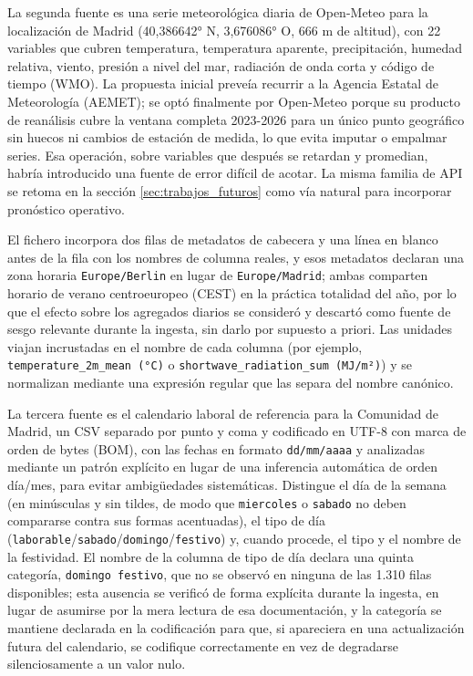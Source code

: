 La segunda fuente es una serie meteorológica diaria de Open-Meteo para la localización de
Madrid (40,386642° N, 3,676086° O, 666 m de altitud), con 22 variables que cubren
temperatura, temperatura aparente, precipitación, humedad relativa, viento, presión a
nivel del mar, radiación de onda corta y código de tiempo (WMO). La propuesta inicial
preveía recurrir a la Agencia Estatal de Meteorología (AEMET); se optó finalmente por
Open-Meteo porque su producto de reanálisis cubre la ventana completa 2023-2026 para un
único punto geográfico sin huecos ni cambios de estación de medida, lo que evita imputar o
empalmar series. Esa operación, sobre variables que después se retardan y promedian,
habría introducido una fuente de error difícil de acotar. La misma familia de API se
retoma en la sección \ref{sec:trabajos_futuros} como vía natural para incorporar
pronóstico operativo.

El fichero incorpora dos filas de metadatos de cabecera y una línea en blanco antes de la
fila con los nombres de columna reales, y esos metadatos declaran una zona horaria
\texttt{Europe/\allowbreak{}Berlin} en lugar de \texttt{Europe/\allowbreak{}Madrid}; ambas comparten horario de
verano centroeuropeo (CEST) en la práctica totalidad del año, por lo que el efecto sobre
los agregados diarios se consideró y descartó como fuente de sesgo relevante durante la
ingesta, sin darlo por supuesto a priori. Las unidades viajan incrustadas en el nombre de
cada columna (por ejemplo, \texttt{temperature\_2m\_mean (°C)} o
\texttt{shortwave\_radiation\_sum (MJ/\allowbreak{}m²)}) y se normalizan mediante una expresión
regular que las separa del nombre canónico.

\begin{sloppypar}
La tercera fuente es el calendario laboral de referencia para la Comunidad de Madrid, un
CSV separado por punto y coma y codificado en UTF-8 con marca de orden de bytes (BOM), con
las fechas en formato \texttt{dd/\allowbreak{}mm/\allowbreak{}aaaa} y analizadas mediante un patrón explícito en
lugar de una inferencia automática de orden día/mes, para evitar ambigüedades
sistemáticas. Distingue el día de la semana (en minúsculas y sin tildes, de modo que
\texttt{miercoles} o \texttt{sabado} no deben compararse contra sus formas acentuadas), el
tipo de día (\texttt{laborable}/\texttt{sabado}/\texttt{domingo}/\texttt{festivo}) y,
cuando procede, el tipo y el nombre de la festividad. El nombre de la columna de tipo de
día declara una quinta categoría, \texttt{domingo festivo}, que no se observó en ninguna
de las 1.310 filas disponibles; esta ausencia se verificó de forma explícita durante la
ingesta, en lugar de asumirse por la mera lectura de esa documentación, y la categoría se
mantiene declarada en la codificación para que, si apareciera en una actualización futura
del calendario, se codifique correctamente en vez de degradarse silenciosamente a un valor
nulo.
\end{sloppypar}

